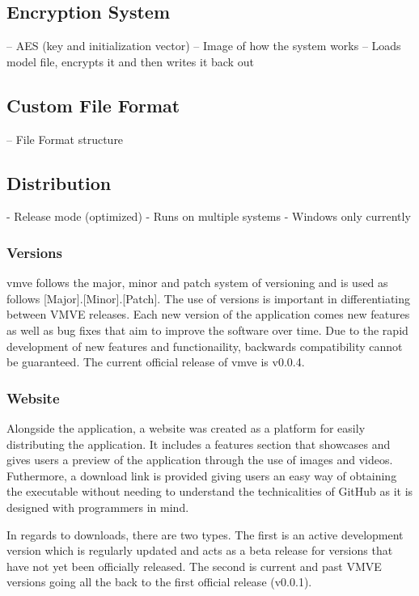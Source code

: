 \documentclass[11pt]{article}
\begin{document}
\subsection{Encryption System}
-- AES (key and initialization vector)
-- Image of how the system works 
  -- Loads model file, encrypts it and then writes it back out


\subsection{Custom File Format}
-- File Format structure



\subsection{Distribution}
- Release mode (optimized)
- Runs on multiple systems
- Windows only currently

\subsubsection{Versions}
\gls{vmve} follows the major, minor and patch system of versioning and is used
as follows [Major].[Minor].[Patch]. The use of versions is important in
differentiating between VMVE releases. Each new version of the application comes
new features as well as bug fixes that aim to improve the software over time.
Due to the rapid development of new features and functionaility, backwards
compatibility cannot be guaranteed. The current official release of \gls{vmve}
is v0.0.4.

\subsubsection{Website}
Alongside the application, a website was created as a platform for easily
distributing the application. It includes a features section that showcases and
gives users a preview of the application through the use of images and videos.
Futhermore, a download link is provided giving users an easy way of obtaining
the executable without needing to understand the technicalities of GitHub as it
is designed with programmers in mind.

In regards to downloads, there are two types. The first is an active development
version which is regularly updated and acts as a beta release for versions that
have not yet been officially released. The second is current and past VMVE versions
going all the back to the first official release (v0.0.1).
\end{document}
